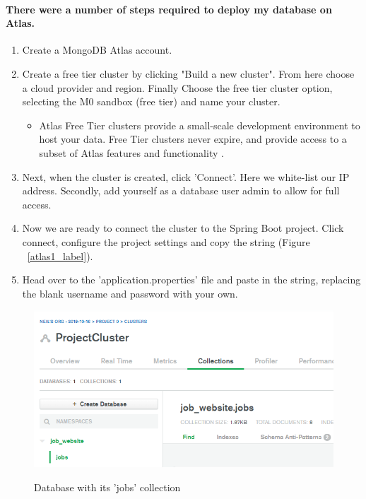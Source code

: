 \paragraph{There were a number of steps required to deploy my database on Atlas.}
\begin{enumerate}
    \item Create a MongoDB Atlas account.
    \item Create a free tier cluster by clicking "Build a new cluster". From here choose a cloud provider and region. Finally Choose the free tier cluster option, selecting the M0 sandbox (free tier) and name your cluster.
    \begin{itemize}
        \item Atlas Free Tier clusters provide a small-scale development environment to host your data. Free Tier clusters never expire, and provide access to a subset of Atlas features and functionality \cite{Atlas}.
    \end{itemize}
    \item Next, when the cluster is created, click 'Connect'. Here we white-list our IP address. Secondly, add yourself as a database user admin to allow for full access.
    \item Now we are ready to connect the cluster to the Spring Boot project. Click connect, configure the project settings and copy the string (Figure ~\ref{atlas1_label}).
    \item Head over to the 'application.properties' file and paste in the string, replacing the blank username and password with your own.
\end{enumerate}
\begin{figure}[h]
    \centering
    \includegraphics[scale=0.37]{Images/atlas2.png}
    \label{atlas2_label}
    \caption{Database with its 'jobs' collection}
\end{figure}
